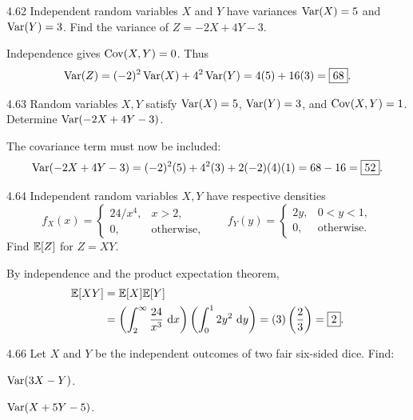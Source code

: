 \documentclass[11pt,oneside]{article}
\begin{document}
\begin{exercise}{4.62}
Independent random variables $X$ and $Y$ have variances $\operatorname{Var}(X)=5$ and $\operatorname{Var}(Y)=3$. Find the variance of $Z=-2X+4Y-3$.
\end{exercise}

\begin{solution}
Independence gives $\operatorname{Cov}(X,Y)=0$. Thus
\[
\operatorname{Var}(Z)=(-2)^2\operatorname{Var}(X)+4^2\operatorname{Var}(Y)=4(5)+16(3)=\boxed{68}.
\]
\end{solution}

\begin{exercise}{4.63}
Random variables $X,Y$ satisfy $\operatorname{Var}(X)=5$, $\operatorname{Var}(Y)=3$, and $\operatorname{Cov}(X,Y)=1$. Determine $\operatorname{Var}(-2X+4Y-3)$.
\end{exercise}

\begin{solution}
The covariance term must now be included:
\[
\operatorname{Var}(-2X+4Y-3)=(-2)^2(5)+4^2(3)+2(-2)(4)(1)
=68-16=\boxed{52}.
\]
\end{solution}

\begin{exercise}{4.64}
Independent random variables $X,Y$ have respective densities
\[
f_X(x)=\begin{cases}24/x^4,&x>2,\\0,&\text{otherwise},\end{cases}
\qquad
f_Y(y)=\begin{cases}2y,&0<y<1,\\0,&\text{otherwise}.\end{cases}
\]
Find $\mathbb{E}[Z]$ for $Z=XY$.
\end{exercise}

\begin{solution}
By independence and the product expectation theorem,
\[
\begin{aligned}
\mathbb{E}[XY]&=\mathbb{E}[X]\mathbb{E}[Y]\\
&=\left(\int_2^\infty \frac{24}{x^3}\,\mathop{}\!\mathrm{d} x\right)
\left(\int_0^1 2y^2\,\mathop{}\!\mathrm{d} y\right)
=(3)\left(\frac23\right)=\boxed{2}.
\end{aligned}
\]
\end{solution}

\begin{exercise}{4.66}
Let $X$ and $Y$ be the independent outcomes of two fair six-sided dice. Find:
\begin{exercisesubparts}
\item $\operatorname{Var}(3X-Y)$.
\item $\operatorname{Var}(X+5Y-5)$.
\end{exercisesubparts}
\end{exercise}
\end{document}
